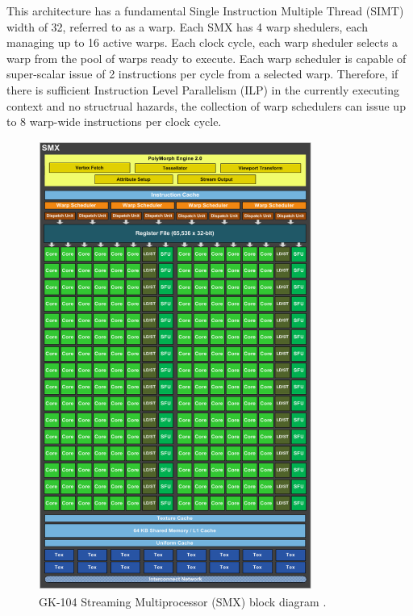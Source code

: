 \documentclass[11pt, oneside, a4paper]{article}
\begin{document}
This architecture has a fundamental Single Instruction Multiple Thread (SIMT) width of 32, referred to as a warp.
Each SMX has 4 warp shedulers, each managing up to 16 active warps. Each clock cycle, each warp sheduler selects a warp from the pool of warps ready to execute. Each warp scheduler is capable of super-scalar issue of 2 instructions per cycle from a selected warp. Therefore, if there is sufficient Instruction Level Parallelism (ILP) in the currently executing context and no structrual hazards, the collection of warp schedulers can issue up to 8 warp-wide instructions per clock cycle.

\begin{figure}[tb]
	\begin{center}
		\includegraphics[width=0.8\textwidth]{SMX}
	\end{center}
	\caption{GK-104 Streaming Multiprocessor (SMX) block diagram \cite{GK-104 Whitepaper}.}
	\label{fig:SMX}
\end{figure}
\end{document}
